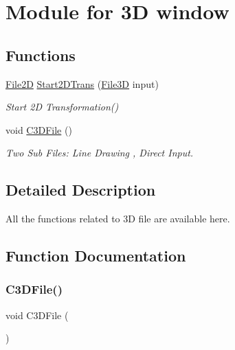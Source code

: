 \hypertarget{group___module1}{}\section{Module for 3D window}
\label{group___module1}
\subsection*{Functions}
\begin{DoxyCompactItemize}
\item 
\mbox{\hyperlink{class_file2_d}{File2D}} \mbox{\hyperlink{group___module1_ga00ce237c3b5588e4f0cb10e3814d3464}{Start2\+D\+Trans}} (\mbox{\hyperlink{class_file3_d}{File3D}} input)
\begin{DoxyCompactList}\small\item\em Start 2D Transformation() \end{DoxyCompactList}\item 
void \mbox{\hyperlink{group___module1_gadf7f424ed19f6ea62548cc3809609eee}{C3\+D\+File}} ()
\begin{DoxyCompactList}\small\item\em Two Sub Files\+: Line Drawing , Direct Input. \end{DoxyCompactList}\end{DoxyCompactItemize}


\subsection{Detailed Description}
All the functions related to 3D file are available here. 

\subsection{Function Documentation}
\mbox{\label{group___module1_gadf7f424ed19f6ea62548cc3809609eee}} 
\subsubsection{\texorpdfstring{C3\+D\+File()}{C3DFile()}}
{\footnotesize\ttfamily void C3\+D\+File (\begin{DoxyParamCaption}{ }\end{DoxyParamCaption})}



